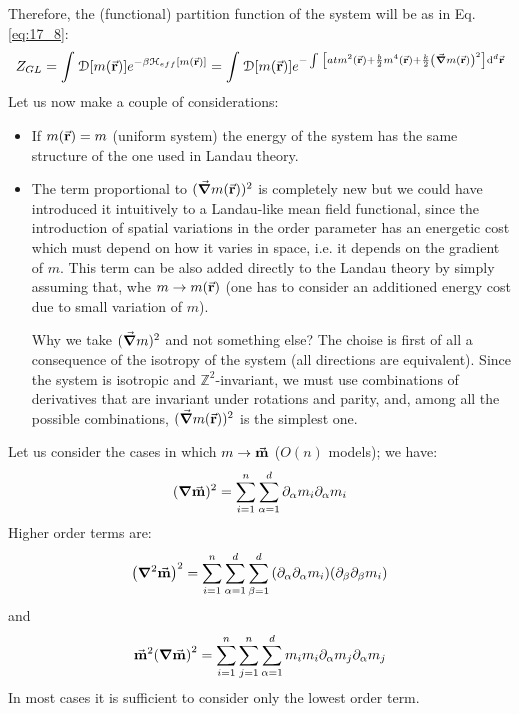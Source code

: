 \documentclass[../../Main/Main.tex]{subfiles}
\begin{document}
Therefore, the (functional) partition function of the system will be as in Eq.\eqref{eq:17_8}:
\begin{equation}
  Z_{GL} = \int_{}^{} \mathcal{D} \qty[m(\va{r})]   e^{ -\beta \mathcal{H}_{eff} [m(\va{r})]}
   = \int_{}^{} \mathcal{D} \qty[m(\va{r})]  e^{-   \int_{}^{}  \qty[a t m^2 (\va{r}) + \frac{b}{2} m^4 (\va{r}) + \frac{k}{2} \qty(\va{\grad } m (\va{r}))^2] \dd[d]{\va{r}}   }
\end{equation}
Let us now make a couple of considerations:
\begin{itemize}
\item If \( m(\va{r}) = m \) (uniform system) the energy of the system has the same structure of the one used in Landau theory.
\item The term proportional to \(   (\va{\grad } m (\va{r}))^2 \) is completely new but we could have introduced it intuitively to a Landau-like mean field functional, since the introduction of spatial variations in the order parameter has an energetic cost which must depend on how it varies in space, i.e. it depends on the gradient of \( m \). This term can be also added directly to the Landau theory by simply assuming that, whe \( m \rightarrow m(\va{r}) \) (one has to consider an additioned energy cost due to small variation of \( m \)).

Why we take \( (\va{\grad }m)^2  \) and not something else?
The choise is first of all a consequence of the isotropy of the system (all directions are equivalent). Since the system is isotropic and \( \mathbb{Z}^2 \)-invariant, we must use combinations of derivatives that are invariant under rotations and parity, and, among all the possible combinations, \(   (\va{\grad } m (\va{r}))^2 \) is the simplest one.

\end{itemize}

\begin{remark}
Let us consider the cases in which  \( m \rightarrow \va{m} \) (\( O(n) \) models); we have:
\begin{equation*}
  (\grad \va{m})^2 = \sum_{i=1}^{n} \sum_{\alpha =1}^{d}  \partial_ \alpha {m_i} \partial_ \alpha   {m_i}
\end{equation*}
Higher order terms are:
\begin{equation*}
  \qty(\grad ^2 \va{m})^2 =  \sum_{i=1}^{n} \sum_{\alpha =1}^{d} \sum_{\beta =1}^{d}
  \qty(\partial_ \alpha \partial_ \alpha {m_i}) \qty( \partial_ \beta \partial_ \beta {m_i})
\end{equation*}
and
\begin{equation*}
  \va{m}^2 \qty(\grad  \va{m})^2 =  \sum_{i=1}^{n} \sum_{j=1}^{n} \sum_{\alpha  =1}^{d} m_i m_i \partial_ \alpha {m_j} \partial_ \alpha {m_j}
\end{equation*}
In most cases it is sufficient to consider only the lowest order term.
\end{remark}
\end{document}
